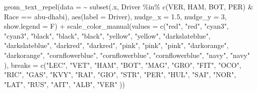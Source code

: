 \documentclass[
]{book}
\newenvironment{Shaded}{\begin{snugshade}}{\end{snugshade}}
\newcommand{\AttributeTok}[1]{\textcolor[rgb]{0.77,0.63,0.00}{#1}}
\newcommand{\DecValTok}[1]{\textcolor[rgb]{0.00,0.00,0.81}{#1}}
\newcommand{\FloatTok}[1]{\textcolor[rgb]{0.00,0.00,0.81}{#1}}
\newcommand{\FunctionTok}[1]{\textcolor[rgb]{0.00,0.00,0.00}{#1}}
\newcommand{\NormalTok}[1]{#1}
\newcommand{\SpecialCharTok}[1]{\textcolor[rgb]{0.00,0.00,0.00}{#1}}
\newcommand{\StringTok}[1]{\textcolor[rgb]{0.31,0.60,0.02}{#1}}
\begin{document}
\begin{Shaded}
\begin{Highlighting}[]
  \FunctionTok{geom\_text\_repel}\NormalTok{(}\AttributeTok{data =} \SpecialCharTok{\textasciitilde{}} \FunctionTok{subset}\NormalTok{(.x, Driver }\SpecialCharTok{\%in\%} \FunctionTok{c}\NormalTok{(}\StringTok{\textquotesingle{}VER\textquotesingle{}}\NormalTok{, }\StringTok{\textquotesingle{}HAM\textquotesingle{}}\NormalTok{, }\StringTok{\textquotesingle{}BOT\textquotesingle{}}\NormalTok{, }\StringTok{\textquotesingle{}PER\textquotesingle{}}\NormalTok{) }\SpecialCharTok{\&}\NormalTok{ Race }\SpecialCharTok{==} \StringTok{\textquotesingle{}abu{-}dhabi\textquotesingle{}}\NormalTok{),}
            \FunctionTok{aes}\NormalTok{(}\AttributeTok{label =}\NormalTok{ Driver),}
            \AttributeTok{nudge\_x =} \FloatTok{1.5}\NormalTok{, }\AttributeTok{nudge\_y =} \DecValTok{3}\NormalTok{, }\AttributeTok{show.legend =}\NormalTok{ F) }\SpecialCharTok{+}
  \FunctionTok{scale\_color\_manual}\NormalTok{(}\AttributeTok{values =} \FunctionTok{c}\NormalTok{(}\StringTok{"red"}\NormalTok{, }\StringTok{"red"}\NormalTok{, }
                                \StringTok{"cyan3"}\NormalTok{, }\StringTok{"cyan3"}\NormalTok{, }
                                \StringTok{"black"}\NormalTok{, }\StringTok{"black"}\NormalTok{, }\StringTok{"black"}\NormalTok{,}
                                \StringTok{"yellow"}\NormalTok{, }\StringTok{"yellow"}\NormalTok{,}
                                \StringTok{"darkslateblue"}\NormalTok{, }\StringTok{"darkslateblue"}\NormalTok{,}
                                \StringTok{"darkred"}\NormalTok{, }\StringTok{"darkred"}\NormalTok{, }
                                \StringTok{"pink"}\NormalTok{, }\StringTok{"pink"}\NormalTok{, }\StringTok{"pink"}\NormalTok{,}
                                \StringTok{"darkorange"}\NormalTok{, }\StringTok{"darkorange"}\NormalTok{,}
                                \StringTok{"cornflowerblue"}\NormalTok{, }\StringTok{"cornflowerblue"}\NormalTok{, }\StringTok{"cornflowerblue"}\NormalTok{,}
                                \StringTok{"navy"}\NormalTok{, }\StringTok{"navy"}
\NormalTok{                                ),}
                     \AttributeTok{breaks =} \FunctionTok{c}\NormalTok{(}\StringTok{"LEC"}\NormalTok{, }\StringTok{"VET"}\NormalTok{,}
                                \StringTok{"HAM"}\NormalTok{, }\StringTok{"BOT"}\NormalTok{,}
                                \StringTok{"MAG"}\NormalTok{, }\StringTok{"GRO"}\NormalTok{, }\StringTok{"FIT"}\NormalTok{,}
                                \StringTok{"OCO"}\NormalTok{, }\StringTok{"RIC"}\NormalTok{,}
                                \StringTok{"GAS"}\NormalTok{, }\StringTok{"KVY"}\NormalTok{,  }
                                \StringTok{"RAI"}\NormalTok{, }\StringTok{"GIO"}\NormalTok{,}
                                \StringTok{"STR"}\NormalTok{, }\StringTok{"PER"}\NormalTok{, }\StringTok{"HUL"}\NormalTok{,  }
                                \StringTok{"SAI"}\NormalTok{, }\StringTok{"NOR"}\NormalTok{,}
                                \StringTok{"LAT"}\NormalTok{, }\StringTok{"RUS"}\NormalTok{, }\StringTok{"AIT"}\NormalTok{,}
                                \StringTok{"ALB"}\NormalTok{, }\StringTok{"VER"}
\NormalTok{                                )) }
\end{Highlighting}
\end{Shaded}
\end{document}
